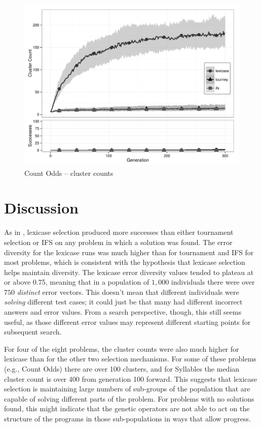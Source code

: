 \begin{figure}[p] %
\centering
\includegraphics[width=11.5cm]{count-odds-cluster.pdf}
\caption{Count Odds -- cluster counts}
\label{count-oddsClu}
\end{figure}


\section{Discussion}
\label{sec:discussion}

As in \citep{Helmuth:2015:GECCO}, lexicase selection produced more successes than 
either tournament selection or IFS on any problem in which a solution was found. 
The error diversity for the lexicase runs was much higher than for tournament
 and IFS for most problems, which is consistent with the hypothesis that
lexicase selection helps maintain diversity. The lexicase error diversity values tended to
plateau at or above 0.75, meaning that in a population of $1,000$ individuals there were over $750$
\emph{distinct} error vectors. This doesn't mean that different individuals were \emph{solving}
different test cases; it could just be that many had different incorrect
answers and error values. From a search perspective, though, this still seems useful, as those different
error values may represent different starting points for subsequent search.

For four of the eight problems, the cluster counts were
also much higher for lexicase than for the other two selection mechanisms. For some of these problems
(e.g., Count Odds) there are over 100 clusters, and for Syllables the median cluster count is over 400
from generation 100 forward.
This suggests that lexicase selection is maintaining large numbers of sub-groups of the population that are 
capable of solving different parts of the problem. 
For problems with no solutions found, this might indicate that the genetic operators are not able to act on the structure 
of the programs in those sub-populations in ways that allow progress.

